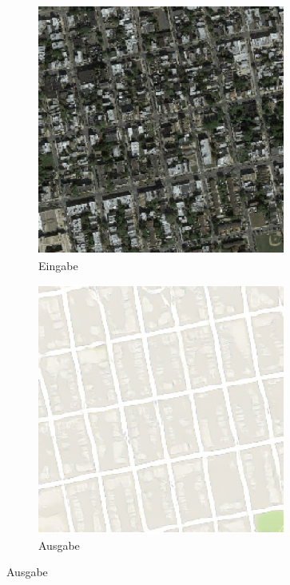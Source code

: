 \begin{figure}[ht]
	\begin{subfigure}[t]{.14\textwidth}
		\centering
		\caption*{Eingabe}
		\includegraphics[width=\linewidth]{images/Pix2PixResults/Eingabe-Bild.png}
	\end{subfigure}
	\begin{subfigure}[t]{.14\textwidth}
		\centering
		\caption*{Ausgabe}
		\includegraphics[width=\linewidth]{images/Pix2PixResults/Generiertes-Bild.png}

\end{subfigure}
\end{figure}
